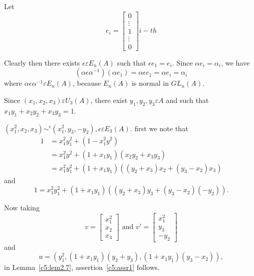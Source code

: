 \begin{Proof}
Let 
$$
e_i=
\begin{bmatrix}
0\\
\vdots\\
1\\
\vdots\\
0
\end{bmatrix} i-th
$$

Clearly then there exists $\epsilon \varepsilon E_n(A)$ such that
$\epsilon e_1=e_i$. Since $\alpha e_i=\alpha_i$, we have
$$
\left(\alpha\epsilon \alpha^{-1}\right)(\alpha e_1)=\alpha \epsilon
e_1 =\alpha e_i =\alpha_i
$$
where $\alpha \epsilon \alpha^{-1} \varepsilon E_n(A)$, because
$E_n(A)$ is normal in $GL_n(A)$.
\enprf
\end{Proof}

\begin{PRFF3}
Since $(x_1,x_2,x_3)\varepsilon U_3(A)$, there exist
$y_1,y_2,y_3\varepsilon A$ and such that $x_1y_1+x_2y_2+x_3y_3=1$.
\end{PRFF3}

\setcounter{assr}{0}
\begin{assr}\label{c5:assr1}
$\left(x^{2}_1,x_2,x_3\right)\displaystyle\mathop{\sim}^{\epsilon}\left(x^{2}_1,y_3,-y_2\right),\epsilon
  \varepsilon E_3(A)$. first we note that 
\begin{align*}
1&= x^{2}_1y^{2}_1+\left(1-x^{2}_1y^{2}\right)\\
&=x^{2}_1y^{2}+(1+x_1y_1)(x_2y_2+x_3y_3)\\
&=x^{2}_1y^{2}_1+(1+x_1y_1)((y_2+x_3)x_2+(y_3-x_2)x_3)
\end{align*}
and 
$$
1=x^{2}_1y^{2}_1+(1+x_1y_1)((y_2+x_3)y_3+(y_3-x_2)(-y_2)).
$$

Now taking 
$$
v=\begin{bmatrix}
x^{2}_1\\
x_2\\
x_3
\end{bmatrix} \text{ and  } v'=\begin{bmatrix}
x^{2}_1\\
y_3\\
-y_2
\end{bmatrix}
$$
and
$$
u=\left(y^{2}_1,\left(1+x_1y_1\right)\left(y_2+y_3\right), \left(1+x_1y_1\right)\left(y_3-x_2\right)\right), 
$$
in Lemma~\ref{c5:lem2.7}, assertion~\ref{c5:assr1} follows.
\end{assr}


